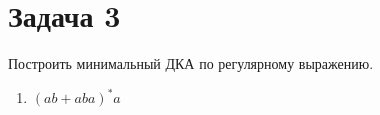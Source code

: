 \documentclass [a4paper, 14pt] {article} %
\begin{document}
\section*{Задача 3}
Построить минимальный ДКА по регулярному выражению.

\begin{enumerate}
    \item 
    $(ab + aba)^*a$
    
    
    
\end{enumerate}
\end{document}
